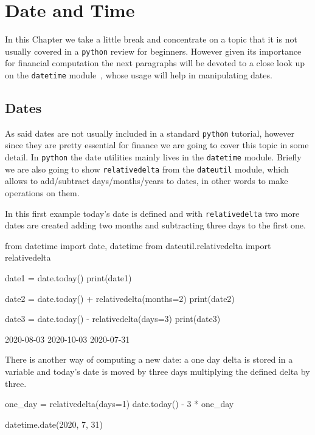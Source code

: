 \chapter{Date and Time}
\label{sec:datetime}

In this Chapter we take a little break and concentrate on a topic that it is not usually covered in a \texttt{python} review for beginners. However given its importance for financial computation the next paragraphs will be devoted to a close look up on the \texttt{datetime} module~\cite{bib:datetime}, whose usage will help in manipulating dates.

\section{Dates}\label{dates}

As said dates are not usually included in a standard \texttt{python} tutorial, however since they
are pretty essential for finance we are going to cover this topic in some detail.
In \texttt{python} the date utilities mainly lives in the \texttt{datetime} module. Briefly we are
also going to show \texttt{relativedelta} from the \texttt{dateutil} module, which allows to
add/subtract days/months/years to dates, in other words to make operations on them.

In this first example today's date is defined and with \texttt{relativedelta} two more dates are created
adding two months and subtracting three days to the first one.

\begin{ipythonnon}
from datetime import date, datetime
from dateutil.relativedelta import relativedelta

date1 = date.today()
print(date1)

date2 = date.today() + relativedelta(months=2)
print(date2)

date3 = date.today() - relativedelta(days=3)
print(date3)
\end{ipythonnon}
\begin{ioutput}
2020-08-03
2020-10-03
2020-07-31
\end{ioutput}

There is another way of computing a new date: a one day delta is stored in a variable
and today's date is moved by three days multiplying the defined delta by three.

\begin{ipythonnon}
one_day = relativedelta(days=1)
date.today() - 3 * one_day
\end{ipythonnon}
\begin{ioutput}
datetime.date(2020, 7, 31)
\end{ioutput}

